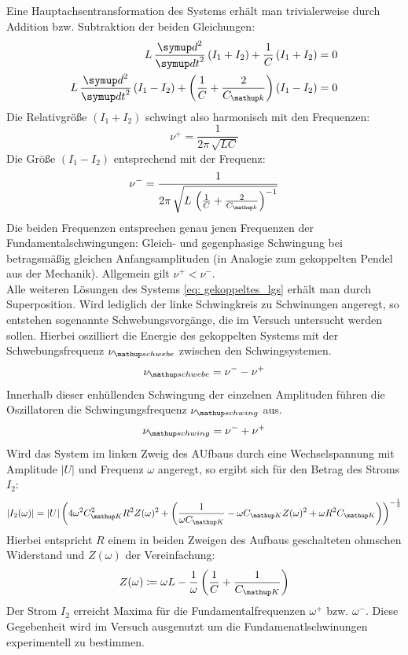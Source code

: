 Eine Hauptachsentransformation des Systems erhält man trivialerweise durch Addition bzw.
Subtraktion der beiden Gleichungen:
\begin{align}
\begin{aligned}
  L\,\frac{\dif{}^2}{\dif{t}^2} \left( I_1 + I_2 \right) + \frac{1}{C} \left( I_1 + I_2 \right) &= 0 \\
  L\,\frac{\dif{}^2}{\dif{t}^2} \left( I_1 - I_2 \right) + \left(\frac{1}{C} + \frac{2}{C\ua{k}}\right) \left( I_1 - I_2 \right) &= 0 \\
  \label{eq: gekoppeltes_lgs}
\end{aligned}
\end{align}
Die Relativgröße $\left( I_1 + I_2 \right)$ schwingt also harmonisch mit den Frequenzen:
\begin{equation}
  \nu^+ = \frac{1}{2\pi \, \sqrt{LC}}
\end{equation}
Die Größe $\left( I_1 - I_2 \right)$ entsprechend mit der Frequenz:
\begin{equation}
\nu^- = \frac{1}{2\pi \, \sqrt{L\, \left(\frac{1}{C} + \frac{2}{C\ua{k}}\right)^{-1}}}
\end{equation}
Die beiden Frequenzen entsprechen genau jenen Frequenzen der Fundamentalschwingungen: Gleich- und gegenphasige Schwingung bei
betragsmäßig gleichen Anfangsamplituden (in Analogie zum gekoppelten Pendel aus der Mechanik). Allgemein gilt $\nu^+ < \nu^-$.\\
Alle weiteren Lösungen des Systems \eqref{eq: gekoppeltes_lgs} erhält man durch Superposition. Wird lediglich der linke Schwingkreis zu Schwinungen
angeregt, so entstehen sogenannte Schwebungsvorgänge, die im Versuch untersucht werden sollen. Hierbei oszilliert die Energie des gekoppelten Systems
mit der Schwebungsfrequenz $\nu\ua{schwebe}$ zwischen den Schwingsystemen.
\begin{equation}
  \nu\ua{schwebe} = \nu^- - \nu^+
\end{equation}
Innerhalb dieser enhüllenden Schwingung der einzelnen Amplituden führen die Oszillatoren die Schwingungsfrequenz $\nu\ua{schwing}$ aus.
\begin{equation}
  \nu\ua{schwing} = \nu^- + \nu^+
\end{equation}
Wird das System im linken Zweig des AUfbaus durch eine Wechselspannung mit Amplitude $\left| U \right|$ und Frequenz $\omega$ angeregt, so ergibt sich für den Betrag des
Stroms $I_2$:
\begin{equation}
|I_2(\omega)| = |U| \left( 4 \omega^2 C\ua{K}^2 R^2 Z(\omega )^2 + \left(\frac{1}{\omega C\ua{K}} - \omega C\ua{K} Z(\omega )^2 + \omega R^2 C\ua{K}\right)\right)^{-\frac{1}{2}}
\end{equation}
Hierbei entspricht $R$ einem in beiden Zweigen des Aufbaus geschalteten ohmschen Widerstand und $Z(\omega)$ der Vereinfachung:
\begin{equation}
  Z(\omega ) \coloneqq \omega L - \frac{1}{\omega } \left(\frac{1}{C} + \frac{1}{C\ua{K}}\right)
\end{equation}
Der Strom $I_2$ erreicht Maxima für die Fundamentalfrequenzen $\omega^+$ bzw. $\omega^-$. Diese Gegebenheit wird im Versuch ausgenutzt um
die Fundamenatlschwinungen experimentell zu bestimmen.
